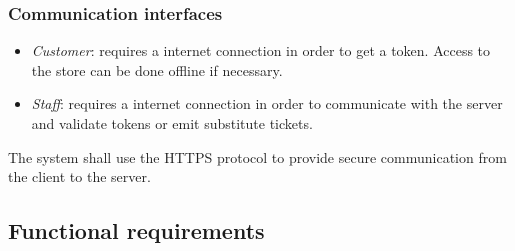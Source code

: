 \subsubsection{Communication interfaces}
\begin{itemize}
    \item \emph{Customer}: requires a internet connection in order to get a token. Access to the store can be done offline if necessary.
    \item \emph{Staff}: requires a internet connection in order to communicate with the server and validate tokens or emit substitute tickets.
\end{itemize}
The system shall use the HTTPS protocol to provide secure communication from the client to the server.
\subsection{Functional requirements}

